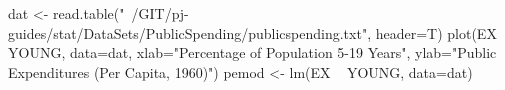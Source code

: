 \begin{Schunk}
\begin{Sinput}
 dat <- read.table("~/GIT/pj-guides/stat/DataSets/PublicSpending/publicspending.txt", header=T)
 plot(EX  ~  YOUNG, data=dat, xlab="Percentage of Population 5-19 Years", ylab="Public Expenditures (Per Capita, 1960)")
 pemod <- lm(EX ~ YOUNG, data=dat)
\end{Sinput}
\end{Schunk}
